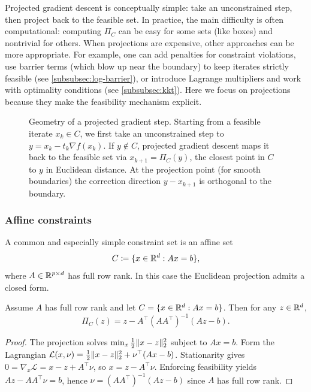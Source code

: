 Projected gradient descent is conceptually simple: take an unconstrained step, then project back to the feasible set.
In practice, the main difficulty is often computational: computing $\Pi_C$ can be easy for some sets (like boxes) and nontrivial for others.
When projections are expensive, other approaches can be more appropriate.
For example, one can add penalties for constraint violations, use barrier terms (which blow up near the boundary) to keep iterates strictly feasible (see \cref{subsubsec:log-barrier}), or introduce Lagrange multipliers and work with optimality conditions (see \cref{subsubsec:kkt}).
Here we focus on projections because they make the feasibility mechanism explicit.

\begin{figure}[t]
  \centering
  
  \caption{Geometry of a projected gradient step.
  Starting from a feasible iterate $x_k\in C$, we first take an unconstrained step to $y=x_k-t_k\nabla f(x_k)$.
  If $y\notin C$, projected gradient descent maps it back to the feasible set via $x_{k+1}=\Pi_C(y)$, the closest point in $C$ to $y$ in Euclidean distance.
  At the projection point (for smooth boundaries) the correction direction $y-x_{k+1}$ is orthogonal to the boundary.}
  \label{fig:projected-gd-geometry}
\end{figure}

\subsubsection{Affine constraints}
\label{subsubsec:affine-equality-constraints}

A common and especially simple constraint set is an affine set
\[
  C \coloneqq \{x\in\mathbb{R}^d:Ax=b\},
\]
where $A\in\mathbb{R}^{p\times d}$ has full row rank.
In this case the Euclidean projection admits a closed form.

\begin{lemma}
\label{lem:proj-affine}
Assume $A$ has full row rank and let $C=\{x\in\mathbb{R}^d:Ax=b\}$.
Then for any $z\in\mathbb{R}^d$,
\[
  \Pi_C(z)=z-A^\top(AA^\top)^{-1}(Az-b).
\]
\end{lemma}
\begin{proof}
The projection solves $\min_x \frac12\lVert x-z\rVert_2^2$ subject to $Ax=b$.
Form the Lagrangian $\mathcal{L}(x,\nu)=\frac12\lVert x-z\rVert_2^2+\nu^\top(Ax-b)$.
Stationarity gives $0=\nabla_x\mathcal{L} = x-z + A^\top \nu$, so $x=z-A^\top\nu$.
Enforcing feasibility yields $Az-AA^\top\nu=b$, hence $\nu=(AA^\top)^{-1}(Az-b)$ since $A$ has full row rank.
\end{proof}

